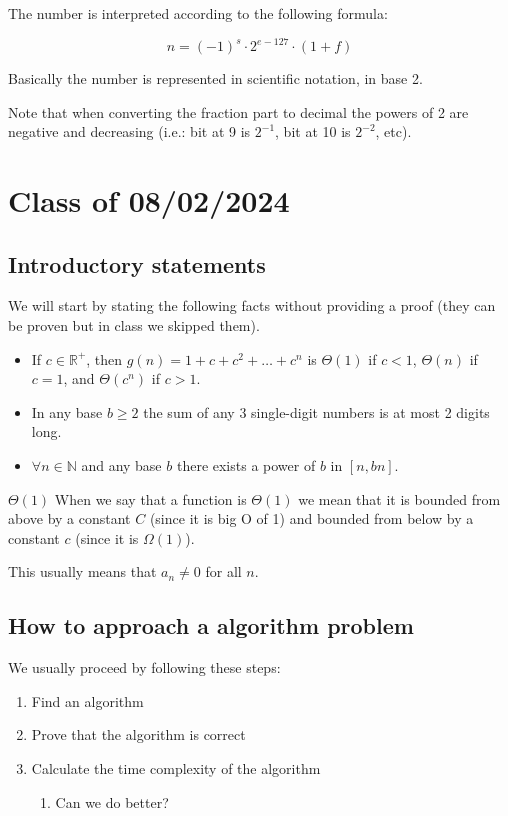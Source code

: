 \documentclass[10pt]{extarticle}
\newcommand{\R}{\mathbb{R}}
\newcommand{\N}{\mathbb{N}}
\begin{document}
The number is interpreted according to the following formula:

$$
    n = (-1)^s \cdot 2^{e - 127} \cdot (1 + f)
$$

Basically the number is represented in scientific notation, in base 2.

Note that when converting the fraction part to decimal the powers of 2 are negative and decreasing
(i.e.: bit at 9 is $2^{-1}$, bit at 10 is $2^{-2}$, etc).

\section{Class of 08/02/2024}

\subsection{Introductory statements}

We will start by stating the following facts without providing a proof (they can be proven but in class we skipped them).

\begin{itemize}
    \item If $c \in \R^+$, then $g(n) = 1 + c + c^2 + \dots + c^n$ is $\Theta(1)$ if $c < 1$, $\Theta(n)$ if $c = 1$, and $\Theta(c^n)$ if $c > 1$.
    \item In any base $b \ge 2$ the sum of any 3 single-digit numbers is at most 2 digits long.
    \item $\forall n \in \N$ and any base $b$ there exists a power of $b$ in $[n, bn].$
\end{itemize}

\begin{notebox}{$\Theta(1)$}
    When we say that a function is $\Theta(1)$ we mean that it is bounded from above by a constant $C$ (since it is big O of 1)
    and bounded from below by a constant $c$ (since it is $\Omega(1)$).

    This usually means that $a_n \ne 0$ for all $n$.
\end{notebox}

\subsection{How to approach a algorithm problem}

We usually proceed by following these steps:
\begin{enumerate}
    \item Find an algorithm
    \item Prove that the algorithm is correct
    \item Calculate the time complexity of the algorithm
          \begin{enumerate}
              \item Can we do better?
          \end{enumerate}
\end{enumerate}
\end{document}
